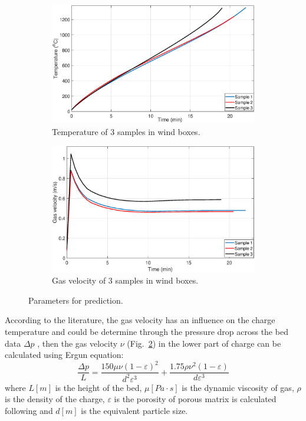 \documentclass[AMS,STIX2COL]{WileyNJD-v2}
\begin{document}
\begin{figure}
	\centering
	\begin{subfigure}{.5\textwidth}
		\centering
		\includegraphics[width=1\linewidth]{2a.eps}
		\caption{Temperature of 3 samples in wind boxes.}
		\label{TempCurves}
	\end{subfigure}%
	\begin{subfigure}{.5\textwidth}
		\centering
		\includegraphics[width=1\linewidth]{2b.eps}
		\caption{Gas velocity of 3 samples in wind boxes.}
		\label{VelocCurves}
	\end{subfigure}
	\caption{Parameters for prediction.}
	\label{fig:PredictParams}
	\end{figure}

According to the literature, the gas velocity has an influence  on the charge temperature and could be determine through the pressure drop across the bed data $\Delta p$ , then the gas velocity $\nu$ (Fig.~\ref{VelocCurves}) in the lower part of charge can be calculated using Ergun equation:
\begin{equation} \label{eq:Ergun}
\frac{\Delta p}{L}=\frac{150\mu \nu(1-\varepsilon)^2}{d^2\varepsilon^3}+
\frac{1.75\rho \nu^2(1-\varepsilon)}{d\varepsilon^3}
\end{equation}
where $L [m]$ is the height of the bed, $\mu [Pa\cdot s]$ is the dynamic viscosity of gas, $\rho$ is the density of the charge, $\varepsilon$ is the porosity of porous matrix is calculated following \cite{Kaymak2017} and $d [m]$  is the equivalent particle size. 
\end{document}

